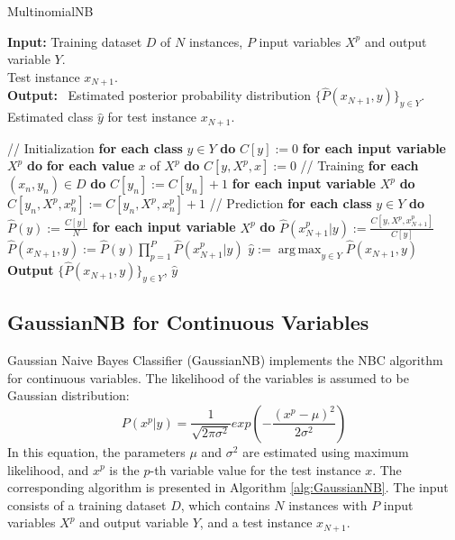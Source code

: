 \documentclass[10pt]{reportMaster}
\DeclareMathOperator*{\argmax}{arg\,max}
\begin{document}
\begin{algorithm}[H]
\caption{MultinomialNB}\label{alg:MultinomialNB}
\textbf{Input:} \; \; Training dataset $D$ of $N$ instances, $P$ input variables $X^p$ and output variable $Y$.\\
\hspace*{\algorithmicindent} \quad \quad \; \; Test instance $x_{N+1}$.\\
\textbf{Output:} \,  Estimated posterior probability distribution $\{ \hat{P}(x_{N+1},y)\}_{y \in Y}$.\\
\hspace*{\algorithmicindent} \quad \quad \; \; Estimated class $\hat{y}$ for test instance $x_{N+1}$.

\begin{algorithmic}[1]
\State // Initialization
\State \textbf{for each class} $y \in Y$ \textbf{do}
\State \qquad $C[y] := 0$
\State \qquad \textbf{for each input variable} $X^p$ \textbf{do}
\State \qquad \qquad \textbf{for each value} $x$ of $X^p$ \textbf{do}
\State \qquad \qquad \qquad $C[y,X^p,x] := 0$
\State // Training
\State \textbf{for each} $(x_n,y_n) \in D$ \textbf{do}
\State \qquad $C[y_n] := C[y_n]+1$
\State \qquad \textbf{for each input variable} $X^p$ \textbf{do}
\State \qquad \qquad $C[y_n,X^p,x_n^p] := C[y_n,X^p,x_n^p]+1$
\State // Prediction
\State \textbf{for each class} $y \in Y$ \textbf{do}
\State \qquad $\hat{P}(y) := \frac{C[y]}{N}$
\State \qquad \textbf{for each input variable} $X^p$ \textbf{do}
\State \qquad \qquad $\hat{P}(x_{N+1}^p|y):=\frac{C[y,X^p,x_{N+1}^p]}{C[y]}$
\State \qquad $\hat{P}(x_{N+1},y):=\hat{P}(y) \prod_{p=1}^P \hat{P}(x_{N+1}^p|y)$
\State $\hat{y}:=\argmax_{y \in Y} \hat{P}(x_{N+1},y)$
\State \textbf{Output} $\{\hat{P}(x_{N+1},y)\}_{y \in Y}$, $\hat{y}$
\end{algorithmic}
\end{algorithm}

\subsection{GaussianNB for Continuous Variables}\label{section:2.2.3}

Gaussian Naive Bayes Classifier (GaussianNB) implements the NBC algorithm for continuous variables. The likelihood of the variables is assumed to be Gaussian distribution:
\begin{equation}
    P(x^p|y)=\frac{1}{\sqrt{2 \pi \sigma^2}}exp\left(-\frac{(x^p-\mu)^2}{2\sigma^2}\right) \tag{4}\label{eq:4}
\end{equation}
\noindent In this equation, the parameters $\mu$ and $\sigma^2$ are estimated using maximum likelihood, and $x^p$ is the $p$-th variable value for the test instance $x$. The corresponding algorithm is presented in Algorithm \ref{alg:GaussianNB}. The input consists of a training dataset $D$, which contains $N$ instances with $P$ input variables $X^p$ and output variable $Y$, and a test instance $x_{N+1}$.\\ 
\end{document}
